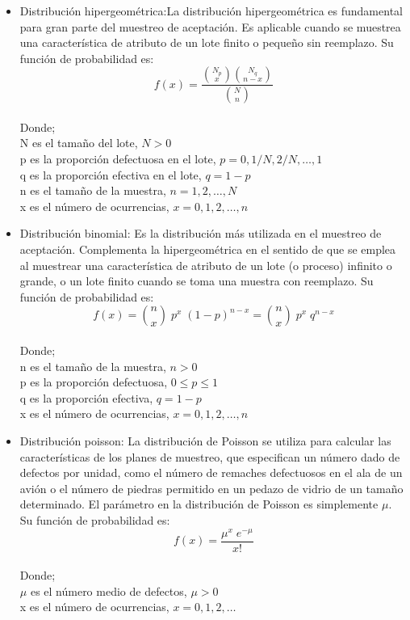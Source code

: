 \begin{itemize}
\item Distribuci\'{o}n hipergeom\'{e}trica:La distribuci\'{o}n hipergeom\'{e}trica es fundamental para gran parte del muestreo de aceptaci\'{o}n. Es aplicable cuando se muestrea una caracter\'{i}stica de atributo de un lote finito o peque\~{n}o sin reemplazo. Su funci\'{o}n de probabilidad es:
$$f(x)=\frac{\binom{N_p}{x}\binom{N_q}{n-x}}{\binom{N}{n}}$$
~\\ Donde; 
~\\ N es el tama\~{n}o del lote, $N>0$
~\\ p es la proporci\'{o}n defectuosa en el lote, $p=0, 1/N, 2/N, \dots , 1$
~\\ q es la proporci\'{o}n efectiva en el lote,  $q=1-p$
~\\ n es el tama\~{n}o de la muestra, $n = 1, 2,\dots, N$
~\\ x es el n\'{u}mero de ocurrencias, $x = 0, 1, 2,\dots, n$

\item Distribuci\'{o}n binomial: Es la distribuci\'{o}n m\'{a}s utilizada en el muestreo de aceptaci\'{o}n. Complementa la hipergeom\'{e}trica en el sentido de que se emplea al muestrear una caracter\'{i}stica de atributo de un lote (o proceso) infinito o grande, o un lote finito cuando se toma una muestra con reemplazo. Su funci\'{o}n de probabilidad es:
$$f(x)=\binom{n}{x} \; p^x \; (1-p)^{n-x}=\binom{n}{x} \; p^x \; q^{n-x}$$
~\\ Donde; 
~\\ n es el tama\~{n}o de la muestra, $n>0$
~\\ p es la proporci\'{o}n defectuosa, $0\leq p \leq 1$
~\\ q es la proporci\'{o}n efectiva, $q=1-p$
~\\ x es el n\'{u}mero de ocurrencias, $x = 0, 1, 2,\dots, n$

\item Distribuci\'{o}n poisson: La distribuci\'{o}n de Poisson se utiliza para calcular las caracter\'{i}sticas de los planes de muestreo, que especifican un n\'{u}mero dado de defectos por unidad, como el n\'{u}mero de remaches defectuosos en el ala de un avi\'{o}n o el n\'{u}mero de piedras permitido en un pedazo de vidrio de un tama\~{n}o determinado. El par\'{a}metro en la distribuci\'{o}n de Poisson es simplemente $\mu$. Su funci\'{o}n de probabilidad es:
$$f(x)=\frac{{\mu}^x \; e^{-\mu}}{x!}$$
~\\ Donde; 
~\\ $\mu$ es el n\'{u}mero medio de defectos, $\mu>0$
~\\ x es el n\'{u}mero de ocurrencias, $x=0,1,2,\dots$
\end{itemize}

